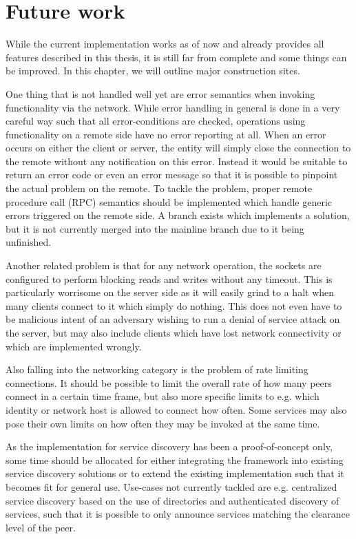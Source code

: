\chapter{Future work}

While the current implementation works as of now and already provides all features described in this thesis, it is still far from complete and some things can be improved.
In this chapter, we will outline major construction sites.

One thing that is not handled well yet are error semantics when invoking functionality via the network.
While error handling in general is done in a very careful way such that all error-conditions are checked, operations using functionality on a remote side have no error reporting at all.
When an error occurs on either the client or server, the entity will simply close the connection to the remote without any notification on this error.
Instead it would be suitable to return an error code or even an error message so that it is possible to pinpoint the actual problem on the remote.
To tackle the problem, proper remote procedure call (RPC) semantics should be implemented which handle generic errors triggered on the remote side.
A branch exists which implements a solution, but it is not currently merged into the mainline branch due to it being unfinished.

Another related problem is that for any network operation, the sockets are configured to perform blocking reads and writes without any timeout.
This is particularly worrisome on the server side as it will easily grind to a halt when many clients connect to it which simply do nothing.
This does not even have to be malicious intent of an adversary wishing to run a denial of service attack on the server, but may also include clients which have lost network connectivity or which are implemented wrongly.

Also falling into the networking category is the problem of rate limiting connections.
It should be possible to limit the overall rate of how many peers connect in a certain time frame, but also more specific limits to e.g. which identity or network host is allowed to connect how often.
Some services may also pose their own limits on how often they may be invoked at the same time.

As the implementation for service discovery has been a proof-of-concept only, some time should be allocated for either integrating the framework into existing service discovery solutions or to extend the existing implementation such that it becomes fit for general use.
Use-cases not currently tackled are e.g. centralized service discovery based on the use of directories and authenticated discovery of services, such that it is possible to only announce services matching the clearance level of the peer.

